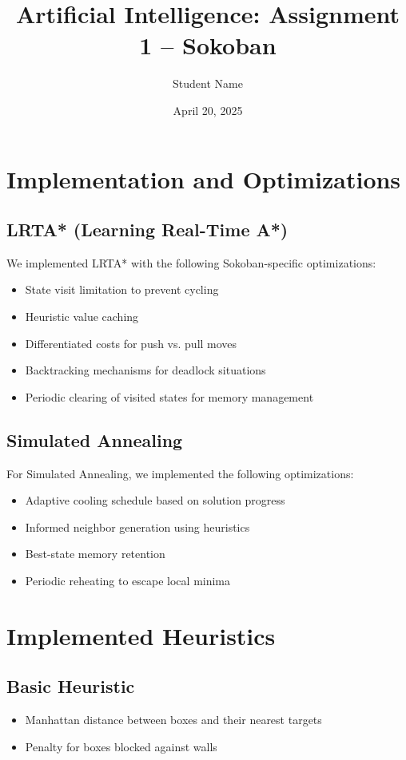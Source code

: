 \documentclass[11pt]{article.cls}
\title{Artificial Intelligence: Assignment 1 – Sokoban}
\author{Student Name}
\date{April 20, 2025}
\begin{document}
\maketitle

\section{Implementation and Optimizations}

\subsection{LRTA* (Learning Real-Time A*)}
We implemented LRTA* with the following Sokoban-specific optimizations:
\begin{itemize}
    \item State visit limitation to prevent cycling
    \item Heuristic value caching
    \item Differentiated costs for push vs. pull moves
    \item Backtracking mechanisms for deadlock situations
    \item Periodic clearing of visited states for memory management
\end{itemize}

\subsection{Simulated Annealing}
For Simulated Annealing, we implemented the following optimizations:
\begin{itemize}
    \item Adaptive cooling schedule based on solution progress
    \item Informed neighbor generation using heuristics
    \item Best-state memory retention
    \item Periodic reheating to escape local minima
\end{itemize}

\section{Implemented Heuristics}

\subsection{Basic Heuristic}
\begin{itemize}
    \item Manhattan distance between boxes and their nearest targets
    \item Penalty for boxes blocked against walls
\end{itemize}
\end{document}
